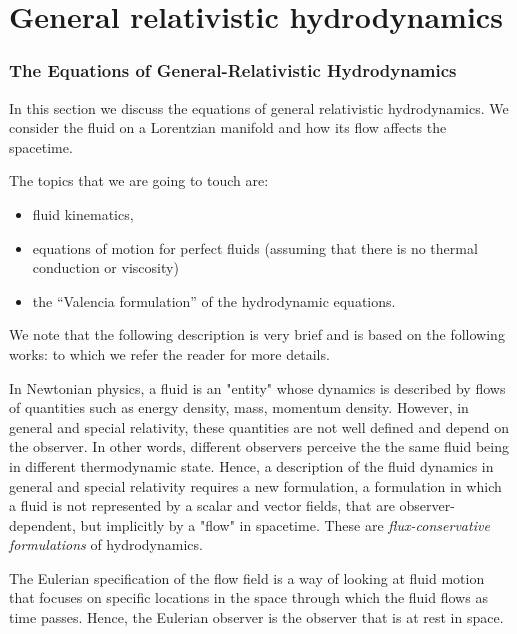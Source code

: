 
\chapter{General relativistic hydrodynamics}



\subsection{The Equations of General-Relativistic Hydrodynamics}


In this section we discuss the equations of general relativistic hydrodynamics. 
We consider the fluid on a Lorentzian manifold and how its flow affects the spacetime.

The topics that we are going to touch are:

\begin{itemize}
    \item fluid kinematics,
    \item equations of motion for perfect fluids (assuming that there is no thermal conduction or viscosity)
    \item the “Valencia formulation” of the hydrodynamic equations.
\end{itemize}


We note that the following description is very brief and is based on the following works: \cite{Misner:1973,Schutz:2009a,Gourgoulhon:2006bn,Andersson:2006nr,Rezzolla:2013} to which we refer the reader for more details.

In Newtonian physics, a fluid is an "entity" whose dynamics is described by flows of quantities such as energy density, mass, momentum density. 
However, in general and special relativity, these quantities are not well defined and depend on the observer. 
In other words, different observers perceive the the same fluid being in different thermodynamic state. 
Hence, a description of the fluid dynamics in general and special relativity requires a new formulation, a formulation in which a fluid is not represented by a scalar and vector fields, that are observer-dependent, but implicitly by a "flow" in spacetime. 
These are \textit{flux-conservative formulations} of hydrodynamics.

The Eulerian specification of the flow field is a way of looking at fluid motion that focuses on specific locations in the space through which the fluid flows as time passes. Hence, the Eulerian observer is the observer that is at rest in space.

